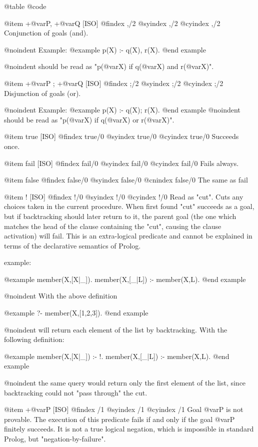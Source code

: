 {{{{@table @code

@item +@var{P}, +@var{Q} [ISO]
@findex ,/2
@syindex ,/2
@cyindex ,/2
Conjunction of goals (and).

@noindent
Example:
@example
 p(X) :- q(X), r(X).
@end example

@noindent
should be read as "p(@var{X}) if q(@var{X}) and r(@var{X})".

@item +@var{P} ; +@var{Q} [ISO]
@findex ;/2 
@syindex ;/2 
@cyindex ;/2 
Disjunction of goals (or).

@noindent
Example:
@example
 p(X) :- q(X); r(X).
@end example
@noindent
should be read as "p(@var{X}) if q(@var{X}) or r(@var{X})".

@item true [ISO]
@findex true/0
@syindex true/0
@cyindex true/0
Succeeds once.

@item fail [ISO]
@findex fail/0
@syindex fail/0
@cyindex fail/0
Fails always.

@item false
@findex false/0
@syindex false/0
@cnindex false/0
The same as fail

@item ! [ISO]
@findex !/0
@syindex !/0
@cyindex !/0
  Read as "cut". Cuts any choices taken in the current procedure.
When first found "cut" succeeds as a goal, but if backtracking should
later return to it, the parent goal (the one which matches the head of
the clause containing the "cut", causing the clause activation) will
fail. This is an extra-logical predicate and cannot be explained in
terms of the declarative semantics of Prolog.

example:

@example
 member(X,[X|_]).
 member(X,[_|L]) :- member(X,L).
@end example

@noindent
With the above definition

@example
 ?- member(X,[1,2,3]).
@end example

@noindent
will return each element of the list by backtracking. With the following
definition:

@example
 member(X,[X|_]) :- !.
 member(X,[_|L]) :- member(X,L).
@end example

@noindent
the same query would return only the first element of the 
list, since backtracking could not "pass through" the cut.

@item \+ +@var{P} [ISO]
@findex \+/1
@syindex \+/1
@cyindex \+/1
Goal @var{P} is not provable. The execution of this predicate fails if
and only if the goal @var{P} finitely succeeds. It is not a true logical
negation, which is impossible in standard Prolog, but
"negation-by-failure".

}}}}
